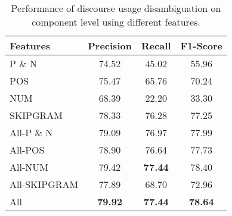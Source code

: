 \begin{table}[ht]
\centering
\begin{tabular}{|l|c|c|c|}
\hline

\bf Features        & \bf Precision & \bf Recall & \bf F1-Score \\ \hline
    P \& N          &     74.52     &     45.02  &     55.96    \\ \hline
    POS             &     75.47     &     65.76  &     70.24    \\ \hline
    NUM             &     68.39     &     22.20  &     33.30    \\ \hline
    SKIPGRAM        &     78.33     &     76.28  &     77.25    \\ \hline
    All-P \& N      &     79.09     &     76.97  &     77.99    \\ \hline
    All-POS         &     78.90     &     76.64  &     77.73    \\ \hline
    All-NUM         &     79.42     & \bf 77.44  &     78.40    \\ \hline
    All-SKIPGRAM    &     77.89     &     68.70  &     72.96    \\ \hline
    All             & \bf 79.92     & \bf 77.44  & \bf 78.64    \\ \hline


\end{tabular}
\caption{\label{t:recognition-features} Performance of discourse usage
disambiguation on component level using different features. }
\end{table}
